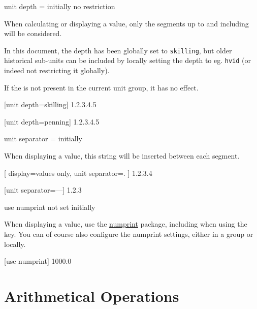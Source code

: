 \documentclass[
	a4paper,
]{article}
\begin{document}
\begin{docKey}
	{unit depth}
	{=}
	{initially no restriction}
	
	When calculating or displaying a value, only the segments up to and including  will be considered.
	
	In this document, the depth has been globally set to \texttt{skilling}, but older historical sub-units can be included by locally setting the depth to eg. \texttt{hvid} (or indeed not restricting it globally).
	
	If the  is not present in the current unit group, it has no effect.
	
\begin{dispExample}
	[unit depth=skilling]
	{1.2.3.4.5}

	[unit depth=penning]
	{1.2.3.4.5}
\end{dispExample}
\end{docKey}

\begin{docKey}
	{unit separator}
	{=}
	{initially }
	
	When displaying a value, this string will be inserted between each segment.

\begin{dispExample}
[
		display=values only,
		unit separator=.
	]
	{1.2.3.4}

	[unit separator={---}]
	{1.2.3}
\end{dispExample}

\end{docKey}

\begin{docKey}
	{use numprint}
	{}
	{not set initially}
	
	When displaying a value, use the \href{https://ctan.org/pkg/numprint}{numprint} package, including when using the  key. You can of course also configure the numprint settings, either in a group or locally.

\begin{dispExample}
\begingroup
{}
	[use numprint]
	{1000.0}
\endgroup
\end{dispExample}

\end{docKey}

\clearpage
\section{Arithmetical Operations} %
\end{document}
